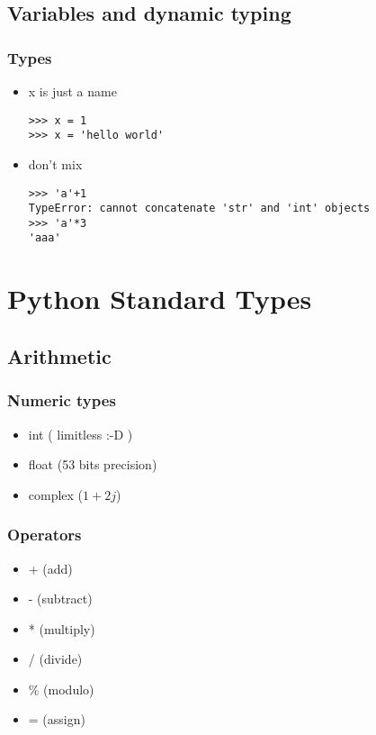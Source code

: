 \documentclass{beamer}
\begin{document}
\subsection{Variables and dynamic typing}
\begin{frame}[fragile]
    \frametitle{Types}
    \begin{itemize}
        \item<1-> x is just a name
            \begin{verbatim}
>>> x = 1
>>> x = 'hello world'
            \end{verbatim}
        \item<2-> don't mix
            \begin{verbatim}
>>> 'a'+1
TypeError: cannot concatenate 'str' and 'int' objects
>>> 'a'*3
'aaa'
            \end{verbatim}
    \end{itemize}
\end{frame}

\section{Python Standard Types}
\subsection{Arithmetic}

\begin{frame}
    \frametitle{Numeric types}
    \begin{itemize}
        \item<1-> int ( limitless :-D )
        \item<2-> float (53 bits precision)
        \item<3-> complex ($1+2j$)
    \end{itemize}
\end{frame}

\begin{frame}
    \frametitle{Operators}
    \begin{itemize}
        \item<1-> + (add)
        \item<2-> - (subtract)
        \item<3-> * (multiply)
        \item<4-> / (divide)
        \item<5-> \% (modulo)
        \item<6-> =	(assign)
    \end{itemize}
\end{frame}
\end{document}
